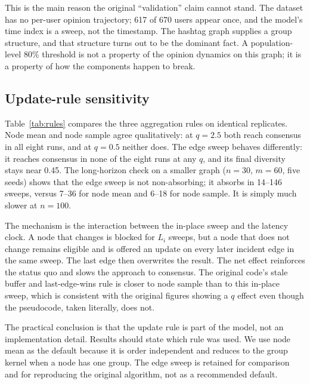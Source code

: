 \documentclass[conference]{IEEEtran}
\begin{document}
This is the main reason the original ``validation'' claim cannot stand. The dataset has no per-user opinion trajectory; 617 of 670 users appear once, and the model's time index is a sweep, not the timestamp. The hashtag graph supplies a group structure, and that structure turns out to be the dominant fact. A population-level 80\% threshold is not a property of the opinion dynamics on this graph; it is a property of how the components happen to break.

\subsection{Update-rule sensitivity}
\begin{table}[t]
\centering
\caption{Update-rule sensitivity on random hypergraphs (normal latency, $\sigma=2$; 8 replicates per rule and $q$; $T=100$). The node-centred rules produce the $q$ effect; the literal edge sweep of Algorithm~1 does not reach consensus within the horizon.}
\label{tab:rules}

\end{table}

Table~\ref{tab:rules} compares the three aggregation rules on identical replicates. Node mean and node sample agree qualitatively: at $q=2.5$ both reach consensus in all eight runs, and at $q=0.5$ neither does. The edge sweep behaves differently: it reaches consensus in none of the eight runs at any $q$, and its final diversity stays near 0.45. The long-horizon check on a smaller graph ($n=30$, $m=60$, five seeds) shows that the edge sweep is not non-absorbing; it absorbs in 14--146 sweeps, versus 7--36 for node mean and 6--18 for node sample. It is simply much slower at $n=100$.

The mechanism is the interaction between the in-place sweep and the latency clock. A node that changes is blocked for $L_i$ sweeps, but a node that does not change remains eligible and is offered an update on every later incident edge in the same sweep. The last edge then overwrites the result. The net effect reinforces the status quo and slows the approach to consensus. The original code's stale buffer and last-edge-wins rule is closer to node sample than to this in-place sweep, which is consistent with the original figures showing a $q$ effect even though the pseudocode, taken literally, does not.

The practical conclusion is that the update rule is part of the model, not an implementation detail. Results should state which rule was used. We use node mean as the default because it is order independent and reduces to the group kernel when a node has one group. The edge sweep is retained for comparison and for reproducing the original algorithm, not as a recommended default.
\end{document}
